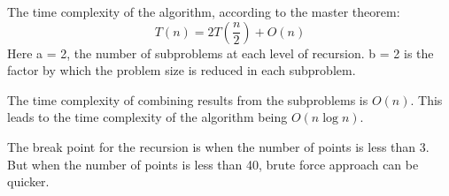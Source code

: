 \documentclass{article}
\begin{document}
  The time complexity of the algorithm, according to the master theorem: 
  \begin{equation}
    T(n) = 2T\left(\frac{n}{2}\right) + O(n) 
  \end{equation}
  Here a = 2, the number of subproblems at each level of recursion.
  b = 2 is the factor by which the problem size is reduced in each subproblem.

  The time complexity of combining results from the subproblems is $O(n)$. 
  This leads to the time complexity of the algorithm being $O(n \log n)$.

  
  The break point for the recursion is when the number of points is less than 3. 
  But when the number of points is less than 40, brute force approach can be quicker.
\end{document}
